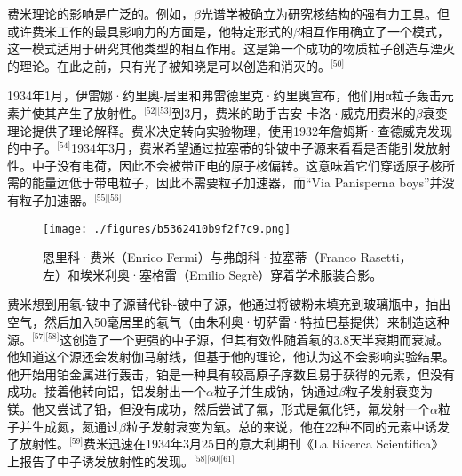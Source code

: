 费米理论的影响是广泛的。例如，$\beta$光谱学被确立为研究核结构的强有力工具。但或许费米工作的最具影响力的方面是，他特定形式的$\beta$相互作用确立了一个模式，这一模式适用于研究其他类型的相互作用。这是第一个成功的物质粒子创造与湮灭的理论。在此之前，只有光子被知晓是可以创造和消灭的。\(^\text{[50]}\)

1934年1月，伊雷娜·约里奥-居里和弗雷德里克·约里奥宣布，他们用α粒子轰击元素并使其产生了放射性。\(^\text{[52][53]}\)到3月，费米的助手吉安-卡洛·威克用费米的$\beta$衰变理论提供了理论解释。费米决定转向实验物理，使用1932年詹姆斯·查德威克发现的中子。\(^\text{[54]}\)1934年3月，费米希望通过拉塞蒂的钋铍中子源来看看是否能引发放射性。中子没有电荷，因此不会被带正电的原子核偏转。这意味着它们穿透原子核所需的能量远低于带电粒子，因此不需要粒子加速器，而“Via Panisperna boys”并没有粒子加速器。\(^\text{[55][56]}\)
\begin{figure}[ht]
\centering
\texttt{[image: ./figures/b5362410b9f2f7c9.png]}
\caption{恩里科·费米（Enrico Fermi）与弗朗科·拉塞蒂（Franco Rasetti，左）和埃米利奥·塞格雷（Emilio Segrè）穿着学术服装合影。} \label{fig_ELK_5}
\end{figure}
费米想到用氡-铍中子源替代钋-铍中子源，他通过将铍粉末填充到玻璃瓶中，抽出空气，然后加入50毫居里的氡气（由朱利奥·切萨雷·特拉巴基提供）来制造这种源。\(^\text{[57][58]}\)这创造了一个更强的中子源，但其有效性随着氡的3.8天半衰期而衰减。他知道这个源还会发射伽马射线，但基于他的理论，他认为这不会影响实验结果。他开始用铂金属进行轰击，铂是一种具有较高原子序数且易于获得的元素，但没有成功。接着他转向铝，铝发射出一个$\alpha$粒子并生成钠，钠通过$\beta$粒子发射衰变为镁。他又尝试了铅，但没有成功，然后尝试了氟，形式是氟化钙，氟发射一个$\alpha$粒子并生成氮，氮通过$\beta$粒子发射衰变为氧。总的来说，他在22种不同的元素中诱发了放射性。\(^\text{[59]}\)费米迅速在1934年3月25日的意大利期刊《La Ricerca Scientifica》上报告了中子诱发放射性的发现。\(^\text{[58][60][61]}\)

